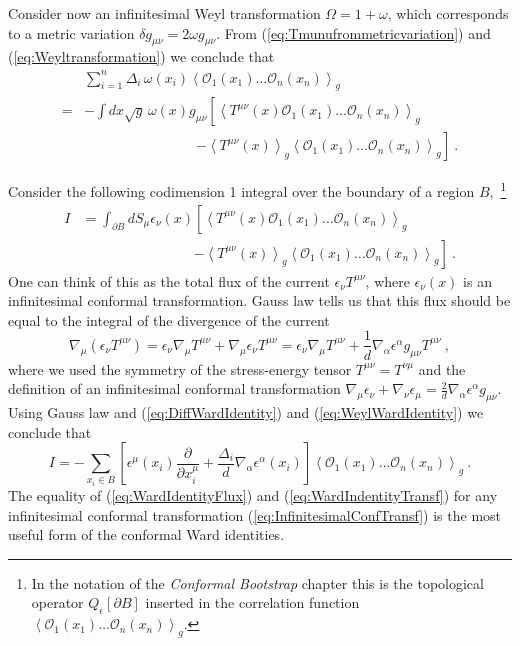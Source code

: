 \documentclass{ws-rv9x6}
\newcommand\be{\begin{equation}}
\newcommand\ee{\end{equation}}
\begin{document}
Consider now an infinitesimal Weyl transformation $\Omega=1+\omega$,
which corresponds to a metric variation $\delta g_{\mu\nu}=2\omega g_{\mu\nu}$.
From (\ref{eq:Tmunufrommetricvariation}) and (\ref{eq:Weyltransformation})
we conclude that 
\begin{align}
 & \sum_{i=1}^{n}\Delta_{i}\,\omega(x_{i})\left\langle \mathcal{O}_{1}(x_{1})\dots\mathcal{O}_{n}(x_{n})\right\rangle _{g} \nonumber\\
= & -\int dx\sqrt{g}\,\omega(x)g_{\mu\nu}\left[\left\langle T^{\mu\nu}(x)\mathcal{O}_{1}(x_{1})\dots\mathcal{O}_{n}(x_{n})\right\rangle _{g}\right. \label{eq:WeylWardIdentity}\\
&\qquad \qquad \qquad \qquad \left.-\left\langle T^{\mu\nu}(x)\right\rangle _{g}\left\langle \mathcal{O}_{1}(x_{1})\dots\mathcal{O}_{n}(x_{n})\right\rangle _{g}\right]\ .\nonumber 
\end{align}


Consider the following codimension 1 integral over the boundary of
a region $B,$ %
\footnote{In the notation of the \emph{Conformal Bootstrap} chapter \cite{arXiv:1602.07982} this is
the topological operator $Q_{\epsilon}[\partial B]$ inserted in the
correlation function $\left\langle \mathcal{O}_{1}(x_{1})\dots\mathcal{O}_{n}(x_{n})\right\rangle _{g}$. %
} 
\begin{align}
I&=\int_{\partial B}dS_{\mu}\epsilon_{\nu}(x)\left[\left\langle T^{\mu\nu}(x)\mathcal{O}_{1}(x_{1})\dots\mathcal{O}_{n}(x_{n})\right\rangle _{g}\right. \label{eq:WardIdentityFlux}\\
&\qquad \qquad \qquad  \qquad \left.-\left\langle T^{\mu\nu}(x)\right\rangle _{g}\left\langle \mathcal{O}_{1}(x_{1})\dots\mathcal{O}_{n}(x_{n})\right\rangle _{g}\right]\ .\nonumber
\end{align}
One can think of this as the total flux of the current $\epsilon_{\nu}T^{\mu\nu}$,
where $\epsilon_{\nu}(x)$ is an infinitesimal conformal transformation.
Gauss law tells us that this flux should be equal to the integral
of the divergence of the current
\be
\nabla_{\mu}\left(\epsilon_{\nu}T^{\mu\nu}\right)=\epsilon_{\nu}\nabla_{\mu}T^{\mu\nu}+ \nabla_{\mu}\epsilon_{\nu} T^{\mu\nu}=\epsilon_{\nu}\nabla_{\mu}T^{\mu\nu}+\frac{1}{d}\nabla_{\alpha}\epsilon^{\alpha}g_{\mu\nu}T^{\mu\nu}\ ,
\ee
where we used the symmetry of the stress-energy tensor $T^{\mu\nu}=T^{\nu\mu}$
and the definition of an infinitesimal conformal transformation $\nabla_{\mu}\epsilon_{\nu}+\nabla_{\nu}\epsilon_{\mu}=\frac{2}{d}\nabla_{\alpha}\epsilon^{\alpha}g_{\mu\nu}$.
Using Gauss law and (\ref{eq:DiffWardIdentity}) and (\ref{eq:WeylWardIdentity})
we conclude that
\begin{equation}
I=-\sum_{x_{i}\in B}\left[\epsilon^{\mu}(x_{i})\frac{\partial}{\partial x_{i}^{\mu}}+\frac{\Delta_{i}}{d}\nabla_{\alpha}\epsilon^{\alpha}(x_{i})\right]\left\langle \mathcal{O}_{1}(x_{1})\dots\mathcal{O}_{n}(x_{n})\right\rangle _{g}\ .\label{eq:WardIndentityTransf}
\end{equation}
The equality of (\ref{eq:WardIdentityFlux}) and (\ref{eq:WardIndentityTransf})
for any infinitesimal conformal transformation (\ref{eq:InfinitesimalConfTransf})
is the most useful form of the conformal Ward identities.
\end{document}
